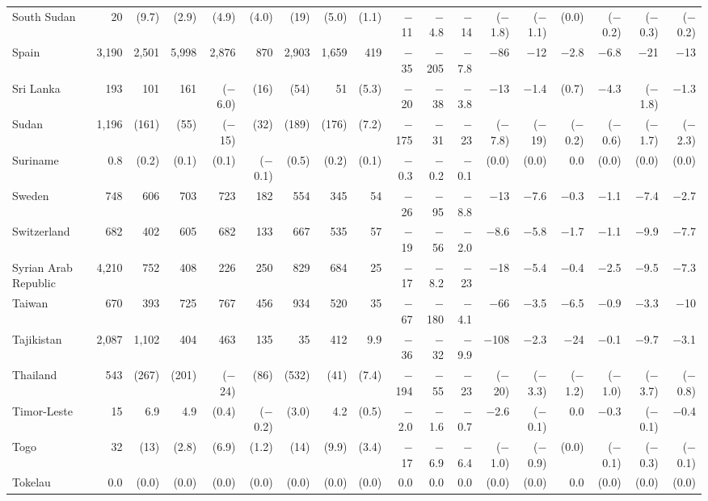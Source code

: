 \begin{longtable}{lrrrrrrrrrrrrrrrrr}
South Sudan & 20 & (9.7) & (2.9) & (4.9) & (4.0) & (19) & (5.0) & (1.1) & $-$11 & $-$4.8 & $-$14 & ($-$1.8) & ($-$1.1) & (0.0) & ($-$0.2) & ($-$0.3) & ($-$0.2) \\
Spain & 3,190 & 2,501 & 5,998 & 2,876 & 870 & 2,903 & 1,659 & 419 & $-$35 & $-$205 & $-$7.8 & $-$86 & $-$12 & $-$2.8 & $-$6.8 & $-$21 & $-$13 \\
Sri Lanka & 193 & 101 & 161 & ($-$6.0) & (16) & (54) & 51 & (5.3) & $-$20 & $-$38 & $-$3.8 & $-$13 & $-$1.4 & (0.7) & $-$4.3 & ($-$1.8) & $-$1.3 \\
Sudan & 1,196 & (161) & (55) & ($-$15) & (32) & (189) & (176) & (7.2) & $-$175 & $-$31 & $-$23 & ($-$7.8) & ($-$19) & ($-$0.2) & ($-$0.6) & ($-$1.7) & ($-$2.3) \\
Suriname & 0.8 & (0.2) & (0.1) & (0.1) & ($-$0.1) & (0.5) & (0.2) & (0.1) & $-$0.3 & $-$0.2 & $-$0.1 & (0.0) & (0.0) & 0.0 & (0.0) & (0.0) & (0.0) \\
Sweden & 748 & 606 & 703 & 723 & 182 & 554 & 345 & 54 & $-$26 & $-$95 & $-$8.8 & $-$13 & $-$7.6 & $-$0.3 & $-$1.1 & $-$7.4 & $-$2.7 \\
Switzerland & 682 & 402 & 605 & 682 & 133 & 667 & 535 & 57 & $-$19 & $-$56 & $-$2.0 & $-$8.6 & $-$5.8 & $-$1.7 & $-$1.1 & $-$9.9 & $-$7.7 \\
Syrian Arab Republic & 4,210 & 752 & 408 & 226 & 250 & 829 & 684 & 25 & $-$17 & $-$8.2 & $-$23 & $-$18 & $-$5.4 & $-$0.4 & $-$2.5 & $-$9.5 & $-$7.3 \\
Taiwan & 670 & 393 & 725 & 767 & 456 & 934 & 520 & 35 & $-$67 & $-$180 & $-$4.1 & $-$66 & $-$3.5 & $-$6.5 & $-$0.9 & $-$3.3 & $-$10 \\
Tajikistan & 2,087 & 1,102 & 404 & 463 & 135 & 35 & 412 & 9.9 & $-$36 & $-$32 & $-$9.9 & $-$108 & $-$2.3 & $-$24 & $-$0.1 & $-$9.7 & $-$3.1 \\
Thailand & 543 & (267) & (201) & ($-$24) & (86) & (532) & (41) & (7.4) & $-$194 & $-$55 & $-$23 & ($-$20) & ($-$3.3) & ($-$1.2) & ($-$1.0) & ($-$3.7) & ($-$0.8) \\
Timor-Leste & 15 & 6.9 & 4.9 & (0.4) & ($-$0.2) & (3.0) & 4.2 & (0.5) & $-$2.0 & $-$1.6 & $-$0.7 & $-$2.6 & ($-$0.1) & 0.0 & $-$0.3 & ($-$0.1) & $-$0.4 \\
Togo & 32 & (13) & (2.8) & (6.9) & (1.2) & (14) & (9.9) & (3.4) & $-$17 & $-$6.9 & $-$6.4 & ($-$1.0) & ($-$0.9) & (0.0) & ($-$0.1) & ($-$0.3) & ($-$0.1) \\
Tokelau & 0.0 & (0.0) & (0.0) & (0.0) & (0.0) & (0.0) & (0.0) & (0.0) & 0.0 & 0.0 & 0.0 & (0.0) & (0.0) & 0.0 & (0.0) & (0.0) & (0.0) \\

\end{longtable}
